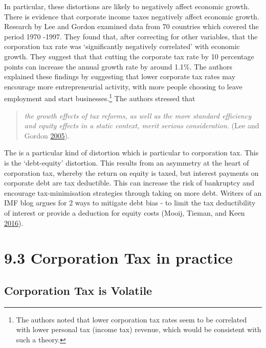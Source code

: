 \documentclass[]{tufte-handout}
\begin{document}
In particular, these distortions are likely to negatively affect
economic growth. There is evidence that corporate income taxes
negatively affect economic growth. Research by Lee and Gordon examined
data from 70 countries which covered the period 1970 -1997. They found
that, after correcting for other variables, that the corporation tax
rate was `significantly negatively correlated' with economic growth.
They suggest that that cutting the corporate tax rate by 10 percentage
points can increase the annual growth rate by around 1.1\%. The authors
explained these findings by suggesting that lower corporate tax rates
may encourage more entrepreneurial activity, with more people choosing
to leave employment and start businesses.\footnote{The authors noted
  that lower corporation tax rates seem to be correlated with lower
  personal tax (income tax) revenue, which would be consistent with such
  a theory.} The authors stressed that

\begin{quote}
\emph{the growth effects of tax reforms, as well as the more standard
efficiency and equity effects in a static context, merit serious
consideration.} (Lee and Gordon \protect\hyperlink{ref-Lee2005}{2005}).
\end{quote}

The is a particular kind of distortion which is particular to
corporation tax. This is the `debt-equity' distortion. This results from
an asymmetry at the heart of corporation tax, whereby the return on
equity is taxed, but interest payments on corporate debt are tax
deductible. This can increase the risk of bankruptcy and encourage
tax-minimisation strategies through taking on more debt. Writers of an
IMF blog argues for 2 ways to mitigate debt bias - to limit the tax
deductibility of interest or provide a deduction for equity costs
(Mooij, Tieman, and Keen \protect\hyperlink{ref-DeMooij2016}{2016}).

\hypertarget{corporation-tax-in-practice}{%
\section{9.3 Corporation Tax in
practice}\label{corporation-tax-in-practice}}

\hypertarget{corporation-tax-is-volatile}{%
\subsection{Corporation Tax is
Volatile}\label{corporation-tax-is-volatile}}
\end{document}
